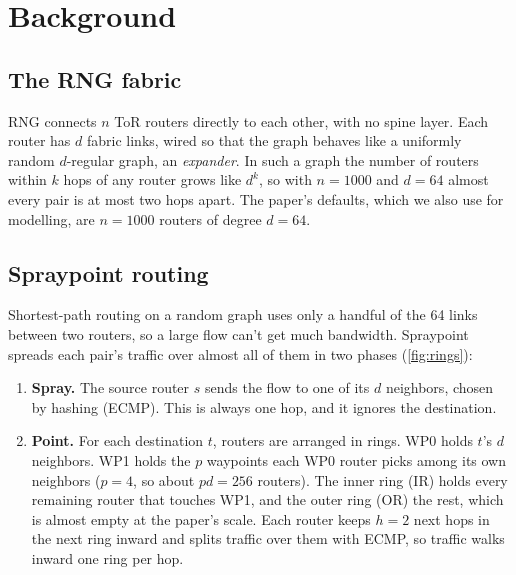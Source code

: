 \section{Background}
\label{sec:background}

\subsection{The RNG fabric}

RNG connects $n$ ToR routers directly to each other, with no spine layer. Each router has $d$ fabric links, wired so that the graph behaves like a uniformly random $d$-regular graph, an \emph{expander}. In such a graph the number of routers within $k$ hops of any router grows like $d^k$, so with $n = 1000$ and $d = 64$ almost every pair is at most two hops apart. The paper's defaults, which we also use for modelling, are $n = 1000$ routers of degree $d = 64$.

\subsection{Spraypoint routing}

Shortest-path routing on a random graph uses only a handful of the 64 links between two routers, so a large flow can't get much bandwidth. Spraypoint spreads each pair's traffic over almost all of them in two phases (\autoref{fig:rings}):

\begin{enumerate}
  \item \textbf{Spray.} The source router $s$ sends the flow to one of its $d$ neighbors, chosen by hashing (ECMP). This is always one hop, and it ignores the destination.
  \item \textbf{Point.} For each destination $t$, routers are arranged in rings. WP0 holds $t$'s $d$ neighbors. WP1 holds the $p$ waypoints each WP0 router picks among its own neighbors ($p = 4$, so about $pd = 256$ routers). The inner ring (IR) holds every remaining router that touches WP1, and the outer ring (OR) the rest, which is almost empty at the paper's scale. Each router keeps $h = 2$ next hops in the next ring inward and splits traffic over them with ECMP, so traffic walks inward one ring per hop.
\end{enumerate}


